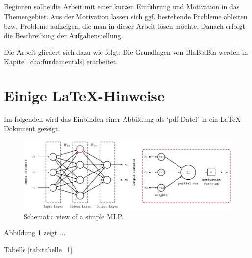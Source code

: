 Beginnen sollte die Arbeit mit einer kurzen Einführung und Motivation in das Themengebiet. Aus der Motivation lassen sich ggf. bestehende Probleme ableiten bzw. Probleme aufzeigen, die man in dieser Arbeit lösen möchte. Danach erfolgt die Beschreibung der Aufgabenstellung.

Die Arbeit gliedert sich dazu wie folgt: Die Grundlagen von BlaBlaBla 
werden in Kapitel \ref{cha:fundamentals} erarbeitet. 

\section{Einige LaTeX-Hinweise}

Im folgenden wird das Einbinden einer Abbildung als `pdf-Datei' in ein
\LaTeX-Dokument gezeigt.

\begin{figure}[H]
	\centering
	\includegraphics[width=\linewidth]{figures/example_fig.pdf}
	\caption[Schematic view of a simple MLP.]{Schematic view of a simple MLP.}
  \label{fig:mlp}
\end{figure}

Abbildung \ref{fig:mlp} zeigt ...

Tabelle \ref{tab:tabelle_1}

